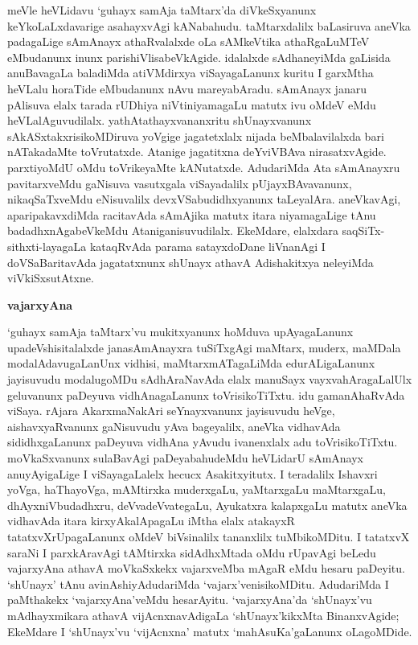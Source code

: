 meVle heVLidavu `guhayx samAja taMtarx'da diVkeSxyanunx keYkoLaLxdavarige asahayxvAgi kANabahudu. taMtarxdalilx baLasiruva aneVka padagaLige sAmAnayx athaRvalalxde oLa sAMkeVtika athaRgaLuMTeV eMbudanunx inunx parishiVlisabeVkAgide. idalalxde sAdhaneyiMda gaLisida anuBavagaLa baladiMda atiVMdirxya viSayagaLanunx kuritu I garxMtha heVLalu horaTide eMbudanunx nAvu mareyabAradu. sAmAnayx janaru pAlisuva elalx tarada rUDhiya niVtiniyamagaLu matutx ivu oMdeV eMdu heVLalAguvudilalx. yathAtathayxvananxritu shUnayxvanunx sAkASxtakxrisikoMDiruva yoVgige jagatetxlalx nijada beMbalavilalxda bari nATakadaMte toVrutatxde. Atanige jagatitxna deYviVBAva nirasatxvAgide. parxtiyoMdU oMdu toVrikeyaMte kANutatxde. AdudariMda Ata sAmAnayxru pavitarxveMdu gaNisuva vasutxgala viSayadalilx pUjayxBAvavanunx, nikaqSaTxveMdu eNisuvalilx devxVSabudidhxyanunx taLeyalAra. aneVkavAgi, aparipakavxdiMda racitavAda sAmAjika matutx itara niyamagaLige tAnu badadhxnAgabeVkeMdu Ataniganisuvudilalx. EkeMdare, elalxdara saqSiTx-sithxti-layagaLa kataqRvAda parama satayxdoDane liVnanAgi I doVSaBaritavAda jagatatxnunx shUnayx athavA Adishakitxya neleyiMda viVkiSxsutAtxne.

\bigskip
\begin{center}
{\Large\bf vajarxyAna}
\end{center}

`guhayx samAja taMtarx'vu mukitxyanunx hoMduva upAyagaLanunx upadeVshisi\-talalxde janasAmAnayxra tuSiTxgAgi maMtarx, muderx, maMDala modalAdavugaLanUnx vidhisi, maMtarxmATagaLiMda edurALigaLanunx jayisuvudu modalugoMDu sAdhAraNavAda elalx manuSayx vayxvahAragaLalUlx geluvanunx paDeyuva vidhAnagaLanunx toVrisikoTiTxtu. idu gamanAhaRvAda viSaya. rAjara AkarxmaNakAri seYnayxvanunx jayisuvudu heVge, aishavxyaRvanunx gaNisuvudu yAva bageyalilx, aneVka vidhavAda sididhxgaLanunx paDeyuva vidhAna yAvudu ivanenxlalx adu toVrisikoTiTxtu. moVkaSxvanunx sulaBavAgi paDeyabahudeMdu heVLidarU sAmAnayx anuyAyigaLige I viSayagaLalelx hecucx Asakitxyitutx. I teradalilx Ishavxri yoVga, haThayoVga, mAMtirxka muderxgaLu, yaMtarxgaLu maMtarxgaLu, dhAyxniVbudadhxru, deVvadeVvategaLu, Ayukatxra kalapxgaLu matutx aneVka vidhavAda itara kirxyAkalApagaLu iMtha elalx atakayxR tatatxvXrUpagaLanunx oMdeV biVsinalilx tananxlilx tuMbikoMDitu. I tatatxvX saraNi I parxkAravAgi tAMtirxka sidAdhxMtada oMdu rUpavAgi beLedu vajarxyAna athavA moVkaSxkekx vajarxveMba mAgaR eMdu hesaru paDeyitu. `shUnayx' tAnu avinAshiyAdudariMda `vajarx'venisikoMDitu. AdudariMda I paMthakekx `vajarxyAna'veMdu hesarAyitu. `vajarxyAna'da `shUnayx'vu mAdhayxmikara athavA vijAcnxnavAdigaLa `shUnayx'kikxMta BinanxvAgide; EkeMdare I `shUnayx'vu `vijAcnxna' matutx `mahAsuKa'gaLanunx oLagoMDide.

